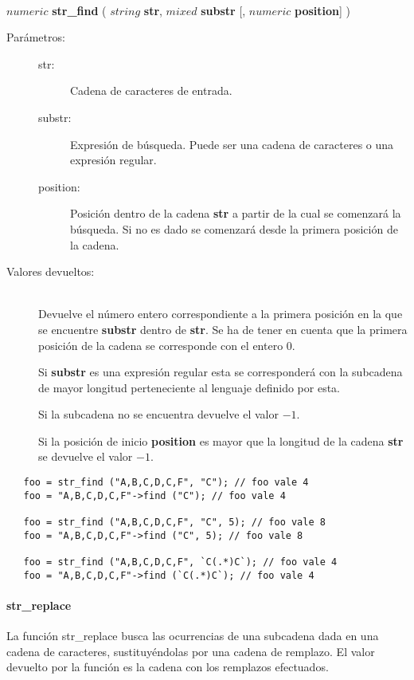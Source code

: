 \begin{framed}
\hfill \\ $numeric$ \textbf{str\_find} ( $string$ \textbf{str}, $mixed$ \textbf{substr} [, $numeric$ \textbf{position}] )  
\begin{description}
\item [Parámetros:] \hfill 
   \begin{description}
   \item[str:] Cadena de caracteres de entrada.
   \item[substr:] Expresión de búsqueda. Puede ser una cadena de caracteres o una expresión regular.  
   \item[position:] Posición dentro de la cadena \textbf{str} a partir de la cual se comenzará la búsqueda. Si no es dado 
   se comenzará desde la primera posición de la cadena.
   \end{description}
\item[Valores devueltos:] \hfill \\
   Devuelve el número entero correspondiente a la primera posición en la que se encuentre \textbf{substr} dentro de \textbf{str}. 
   Se ha de tener en cuenta que la primera posición de la cadena se corresponde con el entero $0$.
   
   Si \textbf{substr} es una expresión regular esta se corresponderá con la subcadena de mayor longitud perteneciente al 
   lenguaje definido por esta. 
   
   Si la subcadena no se encuentra devuelve el valor $-1$. 
   
   Si la posición de inicio \textbf{position} es mayor que la longitud de la cadena \textbf{str} se devuelve el valor $-1$. 
\end{description}
\end{framed}

\begin{lstlisting}
   foo = str_find ("A,B,C,D,C,F", "C"); // foo vale 4  
   foo = "A,B,C,D,C,F"->find ("C"); // foo vale 4

   foo = str_find ("A,B,C,D,C,F", "C", 5); // foo vale 8 
   foo = "A,B,C,D,C,F"->find ("C", 5); // foo vale 8
   
   foo = str_find ("A,B,C,D,C,F", `C(.*)C`); // foo vale 4
   foo = "A,B,C,D,C,F"->find (`C(.*)C`); // foo vale 4
\end{lstlisting}


\paragraph {str\_replace}
La función str\_replace busca las ocurrencias de una subcadena dada en una cadena de caracteres, sustituyéndolas
por una cadena de remplazo. El valor devuelto por la función es la cadena con los remplazos efectuados. \\

